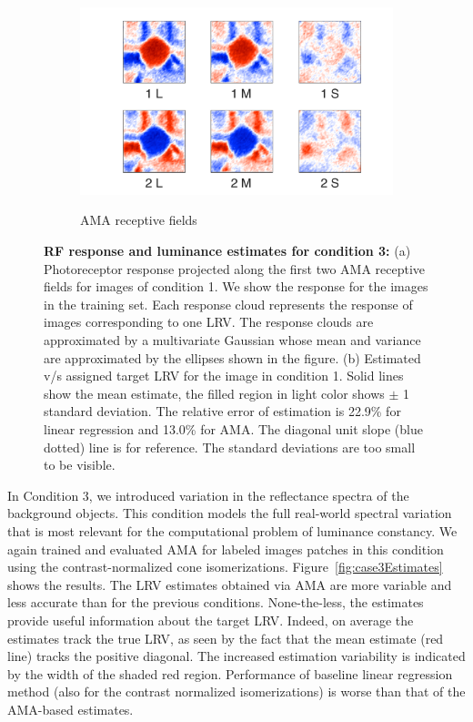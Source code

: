 \documentclass{jov}
\begin{document}
\begin{figure}
\begin{subfigure}[b]{0.26\textwidth}
        \label{fig:case3RFResponse}
    \end{subfigure}
    ~
    \begin{subfigure}[b]{0.28 \textwidth}
	\caption{AMA receptive fields}
	\includegraphics[width=1.07\textwidth, trim={0 -0.6cm 0 -0.5cm}]{../FiguresDraft4/Figure12/Figure12_c.pdf}
	\label{fig:case3RFs}
    \end{subfigure}       \caption{{\bf RF response and luminance estimates for condition 3:} (a) Photoreceptor response projected along the first two AMA receptive fields for images of condition 1. We show the response for the images in the training set. Each response cloud represents the response of images corresponding to one LRV. The response clouds are approximated by a multivariate Gaussian whose mean and variance are approximated by the ellipses shown in the figure. (b)  Estimated v/s assigned target LRV for the image in condition 1. Solid lines show the mean estimate, the filled region in light color shows $\pm$ 1 standard deviation. The relative error of estimation is 22.9\%  for linear regression and 13.0\% for AMA. The diagonal unit slope (blue dotted) line is for reference. The standard deviations are too small to be visible.}
\label{fig:Condition3}
\end{figure}

In Condition 3, we introduced variation in the reflectance spectra of the background objects.
This condition models the full real-world spectral variation that is most relevant for the computational problem of luminance constancy.
We again trained and evaluated AMA for labeled images patches in this condition using the contrast-normalized cone isomerizations.
Figure~\ref{fig:case3Estimates} shows the results.
The LRV estimates obtained via AMA are more variable and less accurate than for the previous conditions.
None-the-less, the estimates provide useful information about the target LRV.
Indeed, on average the estimates track the true LRV, as seen by the fact that the mean estimate
(red line) tracks the positive diagonal.
The increased estimation variability is indicated by the width of the shaded red region.
Performance of baseline linear regression method (also for the contrast normalized isomerizations) is worse than that of the AMA-based estimates.
\end{document}

